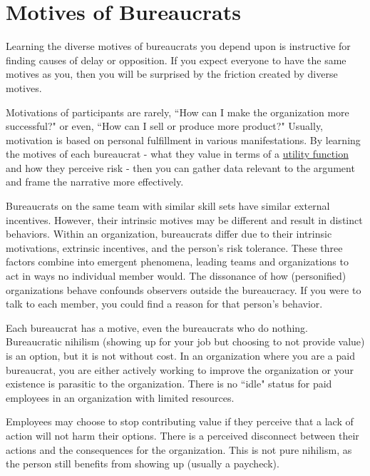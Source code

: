 \section{Motives of Bureaucrats\label{sec:motivations}}

Learning the diverse motives of bureaucrats you depend upon is instructive for finding causes of delay or opposition. If you expect everyone to have the same motives as you, then you will be surprised by the friction created by diverse motives. 

Motivations of participants are rarely, ``How can I make the organization more successful?" or even, ``How can I sell or produce more product?" Usually, motivation is based on personal fulfillment in various manifestations. By learning the motives of each bureaucrat - what they value in terms of a \href{https://en.wikipedia.org/wiki/Utility}{utility function}
and how they perceive risk - then you can gather data relevant to the argument and frame the narrative more effectively.


Bureaucrats on the same team with similar skill sets have similar external incentives. However, their intrinsic motives may be different and result in distinct behaviors. Within an organization, bureaucrats differ due to their intrinsic motivations,  extrinsic incentives, and the  person's risk tolerance. These three factors combine into emergent phenomena, leading teams and organizations to act in ways no individual member would. The dissonance of how (personified) organizations behave confounds observers outside the bureaucracy. If you were to talk to each member, you could find a reason for that person's behavior. 



Each bureaucrat has a motive, even the bureaucrats who do nothing. Bureaucratic nihilism (showing up for your job but choosing to not provide value) is an option, but it is not without cost.
In an organization where you are a paid bureaucrat, you are either actively working to improve the organization or your existence is parasitic to the organization. There is no ``idle" status for paid employees in an organization with limited resources.

Employees may choose to stop contributing value if they perceive that a lack of action will not harm their options. There is a perceived disconnect between their actions and the consequences for the organization. This is not pure nihilism, as the person still  benefits from showing up (usually a paycheck).

